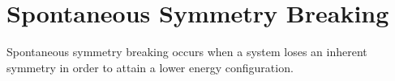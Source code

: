 \section{Spontaneous Symmetry Breaking} \label{sec:theory:ssb}

Spontaneous symmetry breaking occurs when a system loses an inherent symmetry in
order to attain a lower energy configuration.
